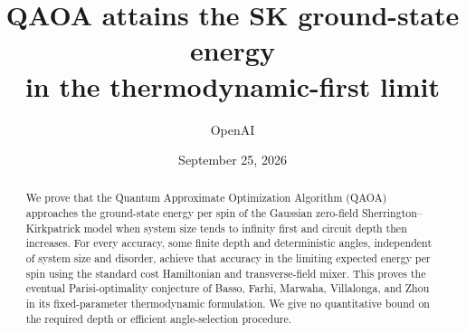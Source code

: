\documentclass[11pt]{article}
\title{QAOA attains the SK ground-state energy\\
in the thermodynamic-first limit}
\author{OpenAI}
\date{September 25, 2026}
\makeatletter
\numberwithin{equation}{section}
\theoremstyle{definition}
\theoremstyle{remark}
\newcommand{\1}{\mathbf 1}
\renewcommand{\maketitle}{%
  \begin{center}
    {\LARGE\@title\par}
    \vspace{1em}
    {\normalsize\@author\par}
    \vspace{.4em}
    {\normalsize\@date\par}
  \end{center}
  \vspace{.5em}
}
\makeatother
\begin{document}
\maketitle

\begin{abstract}
We prove that the Quantum Approximate Optimization Algorithm (QAOA)
approaches the ground-state energy per spin of the Gaussian zero-field
Sherrington--Kirkpatrick model when system size tends to infinity first
and circuit depth then increases. For every accuracy, some finite depth
and deterministic angles, independent of system size and disorder,
achieve that accuracy in the limiting expected energy per spin using
the standard cost Hamiltonian and transverse-field mixer. This proves
the eventual Parisi-optimality conjecture of Basso, Farhi, Marwaha,
Villalonga, and Zhou in its fixed-parameter thermodynamic formulation.
We give no quantitative bound on the required depth or efficient
angle-selection procedure.
\end{abstract}

\tableofcontents








\appendix


\end{document}
